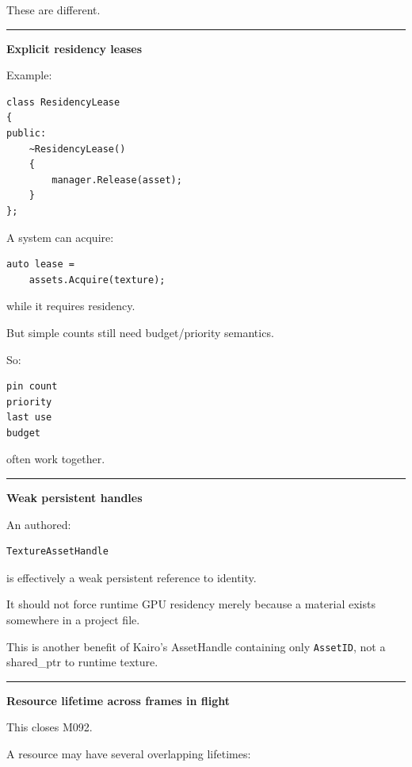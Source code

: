 These are different.

\begin{center}\rule{0.5\linewidth}{0.5pt}\end{center}

\textbf{Explicit residency leases}

Example:

\begin{verbatim}
class ResidencyLease
{
public:
    ~ResidencyLease()
    {
        manager.Release(asset);
    }
};
\end{verbatim}

A system can acquire:

\begin{verbatim}
auto lease =
    assets.Acquire(texture);
\end{verbatim}

while it requires residency.

But simple counts still need budget/priority semantics.

So:

\begin{verbatim}
pin count
priority
last use
budget
\end{verbatim}

often work together.

\begin{center}\rule{0.5\linewidth}{0.5pt}\end{center}

\textbf{Weak persistent handles}

An authored:

\begin{verbatim}
TextureAssetHandle
\end{verbatim}

is effectively a weak persistent reference to identity.

It should not force runtime GPU residency merely because a material exists somewhere in a project file.

This is another benefit of Kairo's AssetHandle containing only \texttt{AssetID}, not a shared\_ptr to runtime texture.

\begin{center}\rule{0.5\linewidth}{0.5pt}\end{center}

\textbf{Resource lifetime across frames in flight}

This closes M092.

A resource may have several overlapping lifetimes:

